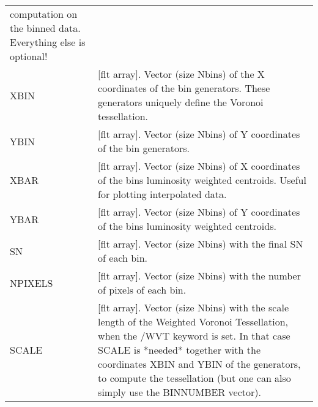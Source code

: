 \begin{center}
\begin{longtable}{p{2.7cm}| p{11.1cm}}
           computation on the binned data. Everything else is optional!\\
%
     XBIN &[flt array].  Vector (size Nbins) of the X coordinates of the bin generators.
           These generators uniquely define the Voronoi tessellation.\\
%
     YBIN &[flt array].  Vector (size Nbins) of Y coordinates of the bin generators.\\
%
     XBAR &[flt array].  Vector (size Nbins) of X coordinates of the bins luminosity
           weighted centroids. Useful for plotting interpolated data.\\
%
     YBAR &[flt array].  Vector (size Nbins) of Y coordinates of the bins luminosity
           weighted centroids.\\
%
       SN &[flt array].  Vector (size Nbins) with the final SN of each bin.\\
%
  NPIXELS &[flt array].  Vector (size Nbins) with the number of pixels of each bin.\\
%
    SCALE &[flt array].  Vector (size Nbins) with the scale length of the Weighted
           Voronoi Tessellation, when the /WVT keyword is set.
           In that case SCALE is *needed* together with the coordinates
           XBIN and YBIN of the generators, to compute the tessellation
           (but one can also simply use the BINNUMBER vector).\\
\hline
\end{longtable}
\end{center}

